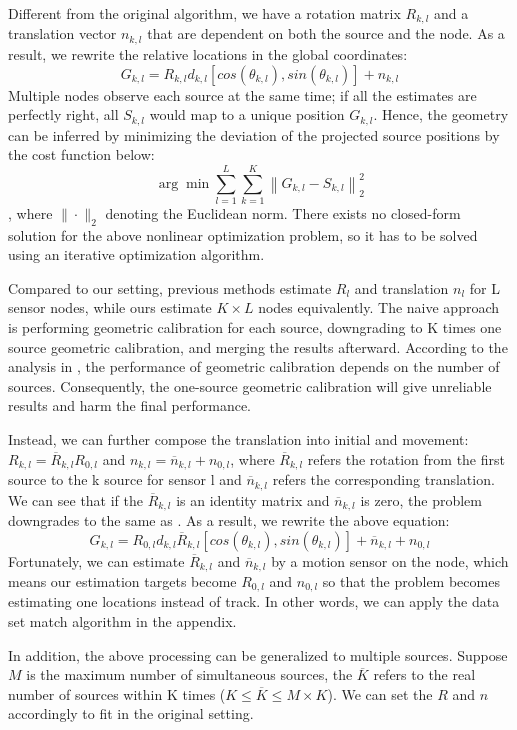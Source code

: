 Different from the original algorithm, we have a rotation matrix \(R_{k,l}\) and a translation vector \(n_{k,l}\) that are dependent on both the source and the node. As a result, we rewrite the relative locations in the global coordinates:
\[
G_{k,l} = R_{k,l} d_{k,l} [cos(\theta_{k,l}), sin(\theta_{k,l})] + n_{k,l}
\]
Multiple nodes observe each source at the same time; if all the estimates are perfectly right, all \( S_{k,l}\) would map to a unique position \( G_{k,l} \). Hence, the geometry can be inferred by minimizing the deviation of the projected source positions by the cost function below:
\[
\arg\min \sum_{l=1}^{L} \sum_{k=1}^{K} \left\| G_{k,l} - S_{k,l} \right\|_2^2
\]
, where \( \| \cdot \|_2 \) denoting the Euclidean norm. There exists no closed-form solution for the above nonlinear optimization problem, so it has to be solved using an iterative optimization algorithm.

Compared to our setting, previous methods estimate 
\(R_{l}\) and translation \(n_{l}\) for L sensor nodes, while ours estimate \(K \times L\) nodes equivalently. The naive approach is performing geometric calibration for each source, downgrading to K times one source geometric calibration, and merging the results afterward.
According to the analysis in \cite{gburrek2021geometry}, the performance of geometric calibration depends on the number of sources. Consequently, the one-source geometric calibration will give unreliable results and harm the final performance.

Instead, we can further compose the translation into initial and movement: 
\(R_{k,l} = \overline{R}_{k,l}R_{0,l}\) and \(n_{k,l} = \overline{n}_{k,l} + n_{0,l}\), where \(\overline{R}_{k,l}\) refers the rotation from the first source to the k source for sensor l and \(\overline{n}_{k,l}\) refers the corresponding translation. We can see that if the \(\overline{R}_{k,l}\) is an identity matrix and \(\overline{n}_{k,l}\) is zero, the problem downgrades to the same as \cite{gburrek2021geometry}. As a result, we rewrite the above equation:
\[
G_{k,l} = R_{0,l} d_{k,l} \overline{R}_{k,l} [cos(\theta_{k,l}), sin(\theta_{k,l})] + \overline{n}_{k,l} +  n_{0,l}
\]
Fortunately, we can estimate \(\overline{R}_{k,l}\) and \(\overline{n}_{k,l}\) by a motion sensor on the node, which means our estimation targets become \(R_{0,l}\) and \(n_{0,l}\) so that the problem becomes estimating one locations instead of track. In other words, we can apply the data set match algorithm in the appendix.

In addition, the above processing can be generalized to multiple sources. Suppose \(M\) is the maximum number of simultaneous sources, the \(\overline{K}\) refers to the real number of sources within K times (\(K\leq\overline{K}\leq M \times K\)). We can set the \(R\) and \(n\) accordingly to fit in the original setting.

